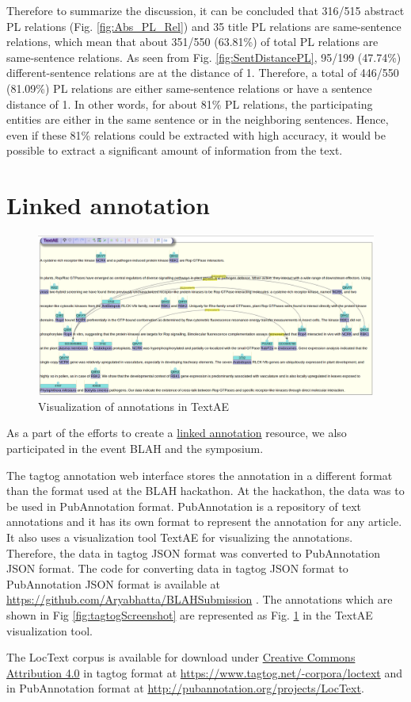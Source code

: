 
Therefore to summarize the discussion, it can be concluded that 316/515 abstract PL relations (Fig. \ref{fig:Abs_PL_Rel}) and 35 title PL relations are same-sentence relations, which mean that about 351/550 (63.81\%) of total PL relations are same-sentence relations. As seen from  Fig. \ref{fig:SentDistancePL}, 95/199 (47.74\%) different-sentence relations are at the distance of 1. Therefore, a total of 446/550 (81.09\%) PL relations are either same-sentence relations or have a sentence distance of 1. In other words, for about 81\% PL relations, the participating entities are either in the same sentence or in the neighboring sentences. Hence, even if these 81\% relations could be extracted with high accuracy, it would be possible to extract a significant amount of information from the text.

\section{Linked annotation}


\begin{figure}
\centering
\includegraphics[scale=0.25]{figures/TextAE_Vis.png}
\caption{Visualization of annotations in TextAE}\label{fig:TextAEVis}
\end{figure}

As a part of the efforts to create a \hyperref[http://2015.linkedannotation.org/background]{linked annotation} resource, we also participated in the event BLAH \cite{blah} and the symposium. 

The tagtog annotation web interface stores the annotation in a different format than the format used at the BLAH hackathon. At the hackathon, the data was to be used in PubAnnotation format. PubAnnotation \cite{kim2012pubannotation} is a repository of text annotations and it has its own format to represent the annotation for any article. It also uses a visualization tool TextAE \cite{textae} for visualizing the annotations. Therefore, the data in tagtog JSON format was converted to PubAnnotation JSON format. The code for converting data in tagtog JSON format to PubAnnotation JSON format is available at \url{https://github.com/Aryabhatta/BLAHSubmission} \cite{blahsubmission}. The annotations which are shown in Fig \ref{fig:tagtogScreenshot} are represented as Fig. \ref{fig:TextAEVis} in the TextAE visualization tool. 

The LocText corpus is available for download under \hyperref[https://creativecommons.org/licenses/by/4.0/]{Creative Commons Attribution 4.0} in tagtog format at \url{https://www.tagtog.net/-corpora/loctext}  and in PubAnnotation format at \url{http://pubannotation.org/projects/LocText}.